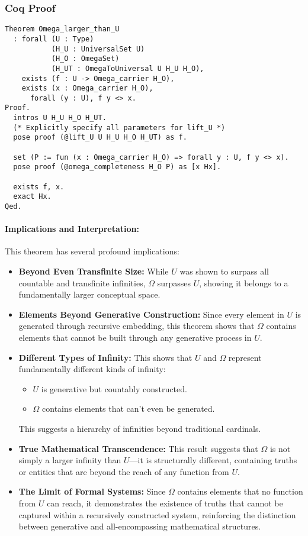 \documentclass[12pt]{article}
\begin{document}
\subsubsection{Coq Proof}
\begin{lstlisting}[language=Coq]
Theorem Omega_larger_than_U
  : forall (U : Type)
           (H_U : UniversalSet U)
           (H_O : OmegaSet)
           (H_UT : OmegaToUniversal U H_U H_O),
    exists (f : U -> Omega_carrier H_O),
    exists (x : Omega_carrier H_O),
      forall (y : U), f y <> x.
Proof.
  intros U H_U H_O H_UT.
  (* Explicitly specify all parameters for lift_U *)
  pose proof (@lift_U U H_U H_O H_UT) as f.
  
  set (P := fun (x : Omega_carrier H_O) => forall y : U, f y <> x).
  pose proof (@omega_completeness H_O P) as [x Hx].

  exists f, x.
  exact Hx.
Qed.
\end{lstlisting}

\paragraph{Implications and Interpretation:}
This theorem has several profound implications:

\begin{itemize}
    \item \textbf{Beyond Even Transfinite Size:} While \( U \) was shown to surpass all countable and transfinite infinities, \( \Omega \) surpasses \( U \), showing it belongs to a fundamentally larger conceptual space.
    \item \textbf{Elements Beyond Generative Construction:} Since every element in \( U \) is generated through recursive embedding, this theorem shows that \( \Omega \) contains elements that cannot be built through any generative process in \( U \).
    \item \textbf{Different Types of Infinity:} This shows that \( U \) and \( \Omega \) represent fundamentally different kinds of infinity:
    \begin{itemize}
        \item \( U \) is generative but countably constructed.
        \item \( \Omega \) contains elements that can’t even be generated.
    \end{itemize}
    This suggests a hierarchy of infinities beyond traditional cardinals.
    \item \textbf{True Mathematical Transcendence:} This result suggests that \( \Omega \) is not simply a larger infinity than \( U \)—it is structurally different, containing truths or entities that are beyond the reach of any function from \( U \).
    \item \textbf{The Limit of Formal Systems:} Since \( \Omega \) contains elements that no function from \( U \) can reach, it demonstrates the existence of truths that cannot be captured within a recursively constructed system, reinforcing the distinction between generative and all-encompassing mathematical structures.
\end{itemize}
\end{document}
